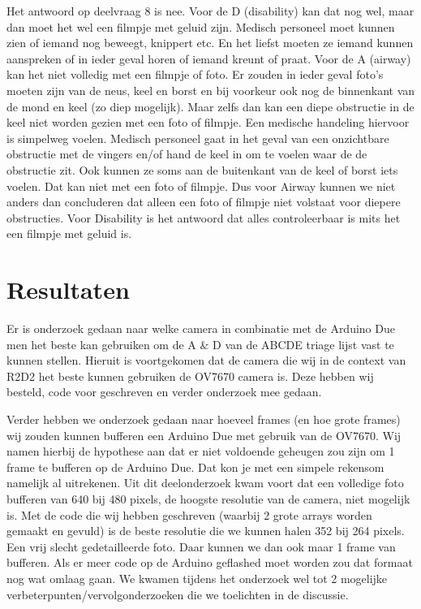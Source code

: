 \documentclass{article}
\begin{document}
Het antwoord op deelvraag 8 is nee. Voor de D (disability) kan dat nog wel, maar dan moet het wel een filmpje met geluid zijn. Medisch personeel moet kunnen zien of iemand nog beweegt, knippert etc. En het liefst moeten ze iemand kunnen aanspreken of in ieder geval horen of iemand kreunt of praat. 
Voor de A (airway) kan het niet volledig met een filmpje of foto. Er zouden in ieder geval foto’s moeten zijn van de neus, keel en borst en bij voorkeur ook nog de binnenkant van de mond en keel (zo diep mogelijk). Maar zelfs dan kan een diepe obstructie in de keel niet worden gezien met een foto of filmpje. Een medische handeling hiervoor is simpelweg voelen. Medisch personeel gaat in het geval van een onzichtbare obstructie met de vingers en/of hand de keel in om te voelen waar de de obstructie zit. Ook kunnen ze soms aan de buitenkant van de keel of borst iets voelen. Dat kan niet met een foto of filmpje. Dus voor Airway kunnen we niet anders dan concluderen dat alleen een foto of filmpje niet volstaat voor diepere obstructies. Voor Disability is het antwoord dat alles controleerbaar is mits het een filmpje met geluid is.


\section{Resultaten}
Er is onderzoek gedaan naar welke camera in combinatie met de Arduino Due men het beste kan gebruiken om de A \& D van de ABCDE triage lijst vast te kunnen stellen. Hieruit is voortgekomen dat de camera die wij in de context van R2D2 het beste kunnen gebruiken de OV7670 camera is. Deze hebben wij besteld, code voor geschreven en verder onderzoek mee gedaan.

Verder hebben we onderzoek gedaan naar hoeveel frames (en hoe grote frames) wij zouden kunnen bufferen een Arduino Due met gebruik van de OV7670. Wij namen hierbij de hypothese aan dat er niet voldoende geheugen zou zijn om 1 frame te bufferen op de Arduino Due. Dat kon je met een simpele rekensom namelijk al uitrekenen. Uit dit deelonderzoek kwam voort dat een volledige foto bufferen van 640 bij 480 pixels, de hoogste resolutie van de camera, niet mogelijk is. Met de code die wij hebben geschreven (waarbij 2 grote arrays worden gemaakt en gevuld) is de beste resolutie die we kunnen halen 352 bij 264 pixels. Een vrij slecht gedetailleerde foto. Daar kunnen we dan ook maar 1 frame van bufferen. Als er meer code op de Arduino geflashed moet worden zou dat formaat nog wat omlaag gaan. We kwamen tijdens het onderzoek wel tot 2 mogelijke verbeterpunten/vervolgonderzoeken die we toelichten in de discussie.
\end{document}
